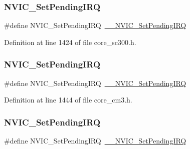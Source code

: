 \subsubsection{\texorpdfstring{N\+V\+I\+C\+\_\+\+Set\+Pending\+I\+RQ}{NVIC\_SetPendingIRQ}\hspace{0.1cm}{\footnotesize\ttfamily [7/13]}}
{\footnotesize\ttfamily \#define N\+V\+I\+C\+\_\+\+Set\+Pending\+I\+RQ~\hyperlink{group___c_m_s_i_s___core___n_v_i_c_functions_gaabefdd4b790b9a7308929938c0c1e1ad}{\+\_\+\+\_\+\+N\+V\+I\+C\+\_\+\+Set\+Pending\+I\+RQ}}



Definition at line 1424 of file core\+\_\+sc300.\+h.

\mbox{\label{group___c_m_s_i_s___core___n_v_i_c_functions_ga2b47e2e52cf5c48a5c3348636434b3ac}} 
\subsubsection{\texorpdfstring{N\+V\+I\+C\+\_\+\+Set\+Pending\+I\+RQ}{NVIC\_SetPendingIRQ}\hspace{0.1cm}{\footnotesize\ttfamily [8/13]}}
{\footnotesize\ttfamily \#define N\+V\+I\+C\+\_\+\+Set\+Pending\+I\+RQ~\hyperlink{group___c_m_s_i_s___core___n_v_i_c_functions_gaabefdd4b790b9a7308929938c0c1e1ad}{\+\_\+\+\_\+\+N\+V\+I\+C\+\_\+\+Set\+Pending\+I\+RQ}}



Definition at line 1444 of file core\+\_\+cm3.\+h.

\mbox{\label{group___c_m_s_i_s___core___n_v_i_c_functions_ga2b47e2e52cf5c48a5c3348636434b3ac}} 
\subsubsection{\texorpdfstring{N\+V\+I\+C\+\_\+\+Set\+Pending\+I\+RQ}{NVIC\_SetPendingIRQ}\hspace{0.1cm}{\footnotesize\ttfamily [9/13]}}
{\footnotesize\ttfamily \#define N\+V\+I\+C\+\_\+\+Set\+Pending\+I\+RQ~\hyperlink{group___c_m_s_i_s___core___n_v_i_c_functions_gaabefdd4b790b9a7308929938c0c1e1ad}{\+\_\+\+\_\+\+N\+V\+I\+C\+\_\+\+Set\+Pending\+I\+RQ}}



